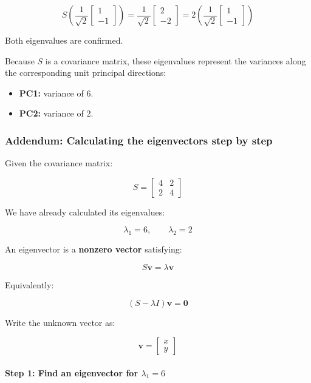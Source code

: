 \documentclass[11pt]{article}
\providecommand{\tightlist}{%
      \setlength{\itemsep}{0pt}\setlength{\parskip}{0pt}}
\begin{document}
\[
S\left(
\frac{1}{\sqrt{2}}
\begin{bmatrix}
1\\
-1
\end{bmatrix}
\right)
=
\frac{1}{\sqrt{2}}
\begin{bmatrix}
2\\
-2
\end{bmatrix}
=
2\left(
\frac{1}{\sqrt{2}}
\begin{bmatrix}
1\\
-1
\end{bmatrix}
\right)
\]

Both eigenvalues are confirmed.

Because \(S\) is a covariance matrix, these eigenvalues represent the
variances along the corresponding unit principal directions:

\begin{itemize}
\tightlist
\item
  \textbf{PC1:} variance of \(6\).
\item
  \textbf{PC2:} variance of \(2\).
\end{itemize}

\subsubsection{Addendum: Calculating the eigenvectors step by
step}\label{addendum-calculating-the-eigenvectors-step-by-step}

Given the covariance matrix:

\[
S =
\begin{bmatrix}
4 & 2 \\
2 & 4
\end{bmatrix}
\]

We have already calculated its eigenvalues:

\[
\lambda_1=6,\qquad\lambda_2=2
\]

An eigenvector is a \textbf{nonzero vector} satisfying:

\[
S\mathbf{v}=\lambda\mathbf{v}
\]

Equivalently:

\[
(S-\lambda I)\mathbf{v}=\mathbf{0}
\]

Write the unknown vector as:

\[
\mathbf{v}=
\begin{bmatrix}
x\\
y
\end{bmatrix}
\]

\paragraph{\texorpdfstring{Step 1: Find an eigenvector for
\(\lambda_1=6\)}{Step 1: Find an eigenvector for \textbackslash lambda\_1=6}}\label{step-1-find-an-eigenvector-for-lambda_16}
\end{document}

